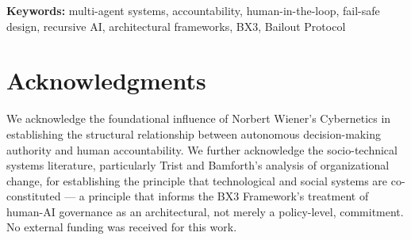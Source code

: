 \documentclass[11pt,oneside]{article}
\begin{document}
\noindent\textbf{Keywords:} multi-agent systems, accountability, human-in-the-loop,
fail-safe design, recursive AI, architectural frameworks, BX3, Bailout Protocol

\newpage


















\section*{Acknowledgments}
We acknowledge the foundational influence of Norbert Wiener's Cybernetics in
establishing the structural relationship between autonomous decision-making
authority and human accountability.  We further acknowledge the socio-technical
systems literature, particularly Trist and Bamforth's analysis of organizational
change, for establishing the principle that technological and social systems are
co-constituted --- a principle that informs the BX3 Framework's treatment of
human-AI governance as an architectural, not merely a policy-level, commitment.
No external funding was received for this work.



\end{document}
